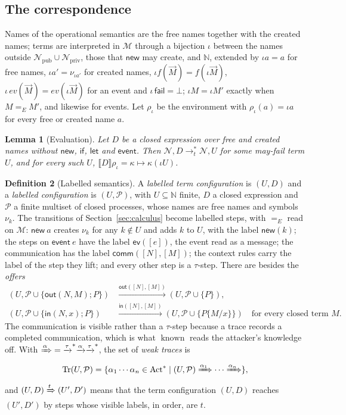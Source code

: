 \documentclass[11pt]{article}
\theoremstyle{definition}
\newtheorem{definition}{Definition}[section]
\theoremstyle{plain}
\newtheorem{lemma}[definition]{Lemma}
\theoremstyle{remark}
\newcommand{\N}{\mathbb{N}}
\newcommand{\Act}{\mathrm{Act}}
\newcommand{\known}{\operatorname{known}}
\newcommand{\sem}[1]{\llbracket #1 \rrbracket}
\newcommand{\Tr}{\operatorname{Tr}}
\begin{document}
\subsection{The correspondence}\label{sec:corr}

Names of the operational semantics are the free names together with the created names; terms are interpreted in $\mathcal{M}$ through a bijection $\iota$ between the names outside $\mathcal{N}_{\mathrm{pub}}\cup\mathcal{N}_{\mathrm{priv}}$, those that $\mathsf{new}$ may create, and $\N$, extended by $\iota a=a$ for free names, $\iota a'=\nu_{\iota a'}$ for created names, $\iota f(\vec M)=f(\iota\vec M)$, $\iota\,ev(\vec M)=ev(\iota\vec M)$ for an event and $\iota\,\mathsf{fail}=\bot$; $\iota M=\iota M'$ exactly when $M=_E M'$, and likewise for events. Let $\rho_\iota$ be the environment with $\rho_\iota(a)=\iota a$ for every free or created name $a$.

\begin{lemma}[Evaluation]\label{lem:eval}
Let $D$ be a closed expression over free and created names without $\mathsf{new}$, $\mathsf{if}$, $\mathsf{let}$ and $\mathsf{event}$. Then $\mathcal{N},D\to_t^*\mathcal{N},U$ for some may-fail term $U$, and for every such $U$, $\sem{D}\rho_\iota=\kappa\mapsto\kappa(\iota U)$.
\end{lemma}

\begin{definition}[Labelled semantics]
A \emph{labelled term configuration} is $(U,D)$ and a \emph{labelled configuration} is $(U,\mathcal{P})$, with $U\subseteq\N$ finite, $D$ a closed expression and $\mathcal{P}$ a finite multiset of closed processes, whose names are free names and symbols $\nu_k$. The transitions of Section~\ref{sec:calculus} become labelled steps, with $=_E$ read on $\mathcal{M}$: $\mathsf{new}\ a$ creates $\nu_k$ for any $k\notin U$ and adds $k$ to $U$, with the label $\mathsf{new}(k)$; the steps on $\mathsf{event}\ e$ have the label $\mathsf{ev}([e])$, the event read as a message; the communication has the label $\mathsf{comm}([N],[M])$; the context rules carry the label of the step they lift; and every other step is a $\tau$-step. There are besides the \emph{offers}
\begin{align*}
(U,\mathcal{P}\cup\{\mathsf{out}(N,M);P\})&\xrightarrow{\mathsf{out}([N],[M])}(U,\mathcal{P}\cup\{P\}),\\
(U,\mathcal{P}\cup\{\mathsf{in}(N,x);P\})&\xrightarrow{\mathsf{in}([N],[M])}(U,\mathcal{P}\cup\{P\{M/x\}\})\quad\text{for every closed term }M.
\end{align*}
The communication is visible rather than a $\tau$-step because a trace records a completed communication, which is what $\known$ reads the attacker's knowledge off. With $\xRightarrow{\alpha}\;=\;\xrightarrow{\tau}^{*}\xrightarrow{\alpha}\xrightarrow{\tau}^{*}$, the set of \emph{weak traces} is
\[
\Tr(U,\mathcal{P})=\{\alpha_1\cdots\alpha_n\in\Act^*\mid (U,\mathcal{P})\xRightarrow{\alpha_1}\cdots\xRightarrow{\alpha_n}\},
\]
and $(U,D)\xRightarrow{t}(U',D')$ means that the term configuration $(U,D)$ reaches $(U',D')$ by steps whose visible labels, in order, are $t$.
\end{definition}
\end{document}
